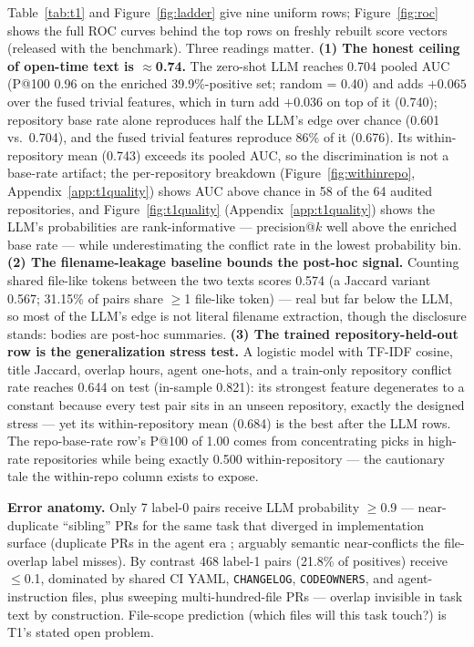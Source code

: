\documentclass{article}
\begin{document}
Table~\ref{tab:t1} and Figure~\ref{fig:ladder} give nine uniform rows; Figure~\ref{fig:roc} shows the full ROC curves behind the top rows on freshly rebuilt score vectors (released with the benchmark). Three readings matter. \textbf{(1) The honest ceiling of open-time text is $\approx$0.74.} The zero-shot LLM reaches 0.704 pooled AUC (P@100 0.96 on the enriched 39.9\%-positive set; random = 0.40) and adds $+0.065$ over the fused trivial features, which in turn add $+0.036$ on top of it (0.740); repository base rate alone reproduces half the LLM's edge over chance (0.601 vs.\ 0.704), and the fused trivial features reproduce 86\% of it (0.676). %
Its within-repository mean (0.743) exceeds its pooled AUC, so the discrimination is not a base-rate artifact; the per-repository breakdown (Figure~\ref{fig:withinrepo}, Appendix~\ref{app:t1quality}) shows AUC above chance in 58 of the 64 audited repositories, and Figure~\ref{fig:t1quality} (Appendix~\ref{app:t1quality}) shows the LLM's probabilities are rank-informative --- precision@$k$ well above the enriched base rate --- while underestimating the conflict rate in the lowest probability bin. %
\textbf{(2) The filename-leakage baseline bounds the post-hoc signal.} Counting shared file-like tokens between the two texts scores 0.574 (a Jaccard variant 0.567; 31.15\% of pairs share $\geq$1 file-like token) --- real but far below the LLM, so most of the LLM's edge is not literal filename extraction, though the disclosure stands: bodies are post-hoc summaries. %
\textbf{(3) The trained repository-held-out row is the generalization stress test.} A logistic model with TF-IDF cosine, title Jaccard, overlap hours, agent one-hots, and a train-only repository conflict rate reaches 0.644 on test (in-sample 0.821): its strongest feature degenerates to a constant because every test pair sits in an unseen repository, exactly the designed stress --- yet its within-repository mean (0.684) is the best after the LLM rows. The repo-base-rate row's P@100 of 1.00 comes from concentrating picks in high-rate repositories while being exactly 0.500 within-repository --- the cautionary tale the within-repo column exists to expose. %

\textbf{Error anatomy.} Only 7 label-0 pairs receive LLM probability $\geq$0.9 --- near-duplicate ``sibling'' PRs for the same task that diverged in implementation surface (duplicate PRs in the agent era \citep{yu2018duppr}; arguably semantic near-conflicts the file-overlap label misses). By contrast 468 label-1 pairs (21.8\% of positives) receive $\leq$0.1, dominated by shared CI YAML, \texttt{CHANGELOG}, \texttt{CODEOWNERS}, and agent-instruction files, plus sweeping multi-hundred-file PRs --- overlap invisible in task text by construction. %
File-scope prediction (which files will this task touch?) is T1's stated open problem.
\end{document}
